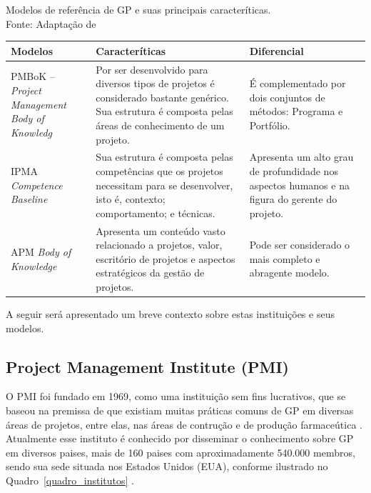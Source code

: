   \begin{quadro}[!h]
    \centering
    \caption{Modelos de referência de GP e suas principais caracteríticas. \\ Fonte: Adaptação de  \label{quadro_referencias}}
    \begin{tabular}{| m{} m{} m{}|}
      \hline
      \textbf{Modelos} & \textbf{Caracteríticas} & \textbf{Diferencial} \\
      \hline \hline
      PMBoK – \textit{Project Management Body of Knowledg}
        & Por ser desenvolvido para diversos tipos de projetos é considerado bastante genérico. Sua estrutura é composta pelas áreas de conhecimento de um projeto.
        & É complementado por dois conjuntos de métodos: Programa e Portfólio. \\ \hline
      IPMA \textit{Competence Baseline}
        & Sua estrutura é composta pelas competências que os projetos necessitam para se desenvolver, isto é, contexto; comportamento; e técnicas.
        & Apresenta um alto grau de profundidade nos aspectos humanos e na figura do gerente do projeto. \\ \hline
      APM \textit{Body of Knowledge}
        & Apresenta um conteúdo vasto relacionado a projetos, valor, escritório de projetos e aspectos estratégicos da gestão de projetos.
        & Pode ser considerado o mais completo e abragente modelo. \\ \hline
    \end{tabular}
  \end{quadro}

  A seguir será apresentado um breve contexto sobre estas instituições e seus modelos.

  \subsection{Project Management Institute (PMI)}

    O PMI foi fundado em 1969, como uma instituição sem fins lucrativos, que se baseou na premissa de que existiam muitas práticas comuns de GP em diversas áreas de projetos, entre elas, nas áreas de contrução e de produção farmaceútica \cite{pmiguide2013}. Atualmente esse instituto é conhecido por disseminar o conhecimento sobre GP em diversos paises, mais de 160 paises com aproximadamente 540.000 membros, sendo sua sede situada nos Estados Unidos (EUA), conforme ilustrado no Quadro~\ref{quadro_institutos} \cite{pmi2013}.

